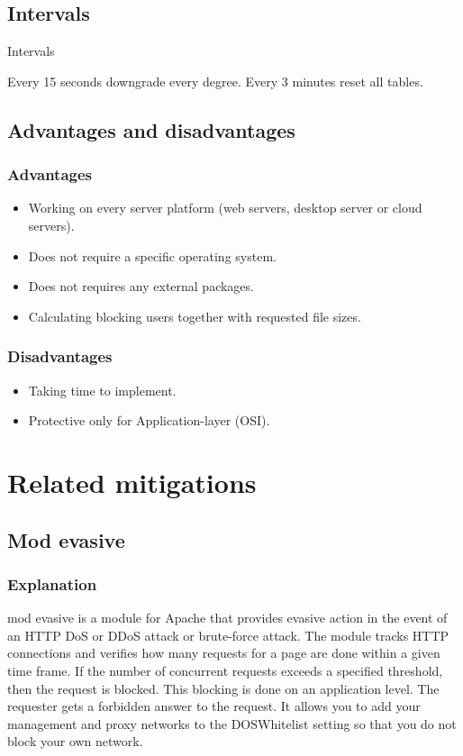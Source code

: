 \documentclass{report}
\begin{document}
\section {Intervals}
  \begin{algorithm}
   \caption{Intervals}
    \begin{algorithmic}[1]
           \State Every 15 seconds downgrade every degree.
	\State Every 3 minutes reset all tables.       
\end{algorithmic}
\end{algorithm}


\section {Advantages and disadvantages }
\subsection{Advantages}

\begin{itemize}
\item Working on every server platform (web servers, desktop server or cloud servers).
\item Does not require a specific operating system.
\item Does not requires any external packages.
\item Calculating blocking users together with requested file sizes.
\end{itemize}
\subsection{Disadvantages}

\begin{itemize}
\item Taking time to implement.
\item Protective only for Application-layer (\gls{OSI}).
\end{itemize}

\chapter {Related mitigations}
\section {Mod evasive}

\subsection {Explanation}
mod evasive is a module for Apache that provides evasive action in the event of an \gls{HTTP} \gls{DoS}  or \gls{DDoS}  attack or brute-force attack. \hfill \break
The module tracks  \gls{HTTP} connections and verifies how many requests for a page are done within a given time frame. If the number of concurrent requests exceeds a specified threshold, then the request is blocked. This blocking is done on an application level. The requester gets a forbidden answer to the request. \hfill \break
It allows you to add your management and proxy networks to the DOSWhitelist setting so that you do not block your own network.
\end{document}
